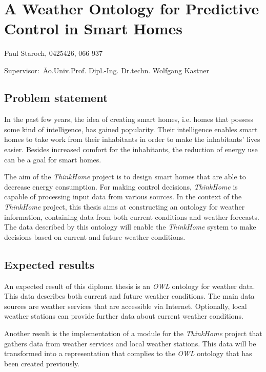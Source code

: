 \documentclass{scrartcl}
\begin{document}
~\vspace{0.5cm}
\section*{A Weather Ontology for Predictive Control in Smart Homes}
Paul Staroch, 0425426, 066 937
\begin{tabbing}
Supervisor:\ \= Ao.Univ.Prof. Dipl.-Ing. Dr.techn. Wolfgang Kastner\\
\end{tabbing}

\subsection*{Problem statement}
In the past few years, the idea of creating smart homes, i.e. homes that possess some kind of intelligence, has gained popularity. Their intelligence enables smart homes to take work from their inhabitants in order to make the inhabitants' lives easier. Besides increased comfort for the inhabitants, the reduction of energy use can be a goal for smart homes.

The aim of the \textit{ThinkHome} project \cite{CR2011-TH_Journal} \cite{CR2010-DEST_ThinkHome} is to design smart homes that are able to decrease energy consumption. For making control decisions, \textit{ThinkHome} is capable of processing input data from various sources. In the context of the \textit{ThinkHome} project, this thesis aims at constructing an ontology for weather information, containing data from both current conditions and weather forecasts. The data described by this ontology will enable the \textit{ThinkHome} system to make decisions based on current and future weather conditions.

\subsection*{Expected results}
An expected result of this diploma thesis is an \textit{OWL} ontology for weather data. This data describes both current and future weather conditions. The main data sources are weather services that are accessible via Internet. Optionally, local weather stations can provide further data about current weather conditions.

Another result is the implementation of a module for the \textit{ThinkHome} project that gathers data from weather services and local weather stations. This data will be transformed into a representation that complies to the \textit{OWL} ontology that has been created previously.
\end{document}
